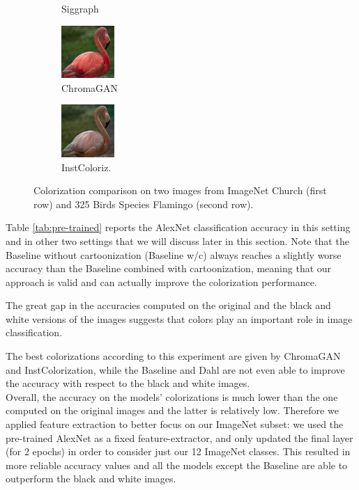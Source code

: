 \begin{figure}[t]
\begin{subfigure}[b]{0.1\textwidth}
		\caption{Siggraph}
	\end{subfigure}
	\hfill
	\begin{subfigure}[b]{0.1\textwidth}
		\includegraphics[width=2cm]{chr - flamingo.jpg}
		\caption{ChromaGAN}
	\end{subfigure}
	\hfill
	\begin{subfigure}[b]{0.1\textwidth}
		\includegraphics[width=2cm]{su - flamingo.png}
		\caption{InstColoriz.}
	\end{subfigure}
	\caption{{\small Colorization comparison on two images from ImageNet Church (first row) and 325 Birds Species Flamingo (second row).}}
	\label{fig:imagenet}
\end{figure}

Table \ref{tab:pre-trained} reports the AlexNet classification accuracy in this setting and in other two settings that we will discuss later in this section. Note that the Baseline without cartoonization (Baseline w/c) always reaches a slightly worse accuracy than the Baseline combined with cartoonization, meaning that our approach is valid and can actually improve the colorization performance.

The great gap in the accuracies computed on the original and the black and white versions of the images suggests that colors play an important role in image classification.

The best colorizations according to this experiment are given by ChromaGAN and InstColorization, while the Baseline and Dahl are not even able to improve the accuracy with respect to the black and white images.\\

Overall, the accuracy on the models' colorizations is much lower than the one computed on the original images and the latter is relatively low. Therefore we applied feature extraction to better focus on our ImageNet subset: we used the pre-trained AlexNet as a fixed feature-extractor, and only updated the final layer (for 2 epochs) in order to consider just our 12 ImageNet classes. This resulted in more reliable accuracy values and all the models except the Baseline are able to outperform the black and white images.\\

